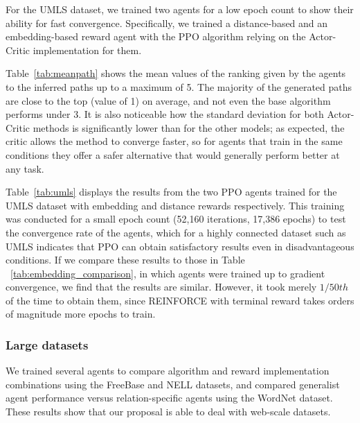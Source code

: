 For the UMLS dataset, we trained two agents for a low epoch count to show their ability for fast convergence. Specifically, we trained a distance-based and an embedding-based reward agent with the PPO algorithm relying on the Actor-Critic implementation for them. 



Table~\ref{tab:meanpath} shows the mean values of the ranking given by the agents to the inferred paths up to a maximum of 5. The majority of the generated paths are close to the top (value of 1) on average, and not even the base algorithm performs under 3. It is also noticeable how the standard deviation for both Actor-Critic methods is significantly lower than for the other models; as expected, the critic allows the method to converge faster, so for agents that train in the same conditions they offer a safer alternative that would generally perform better at any task.



Table~\ref{tab:umls} displays the results from the two PPO agents trained for the UMLS dataset with embedding and distance rewards respectively. This training was conducted for a small epoch count (52,160 iterations, 17,386 epochs) to test the convergence rate of the agents, which for a highly connected dataset such as UMLS indicates that PPO can obtain satisfactory results even in disadvantageous conditions. If we compare these results to those in Table ~\ref{tab:embedding_comparison}, in which agents were trained up to gradient convergence, we find that the results are similar. However, it took merely $1/50th$ of the time to obtain them, since REINFORCE with terminal reward takes orders of magnitude more epochs to train.

\subsubsection{Large datasets}
We trained several agents to compare algorithm and reward implementation combinations using the FreeBase \cite{toutanova2015representing} and NELL \cite{carlson2010toward} datasets, and compared generalist agent performance versus relation-specific agents using the WordNet \cite{miller1995wordnet} dataset. These results show that our proposal is able to deal with web-scale datasets.

